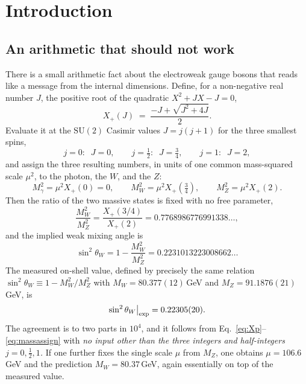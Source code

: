 \documentclass[11pt]{article}
\theoremstyle{plain}
\theoremstyle{definition}
\newcommand{\Xp}{X_{+}}
\newcommand{\half}{\tfrac12}
\newcommand{\threeq}{\tfrac34}
\newcommand{\sinsq}{\sin^{2}\theta_W}
\newcommand{\SU}{\mathrm{SU}}
\begin{document}
\tableofcontents
\bigskip

\section{Introduction}

\subsection{An arithmetic that should not work}

There is a small arithmetic fact about the electroweak gauge bosons that
reads like a message from the internal dimensions. Define, for a
non-negative real number $J$, the positive root of the quadratic
$X^2+JX-J=0$,
\begin{equation}
\Xp(J)\;=\;\frac{-J+\sqrt{J^2+4J}}{2}.
\label{eq:Xp}
\end{equation}
Evaluate it at the $\SU(2)$ Casimir values $J=j(j+1)$ for the three
smallest spins,
\begin{equation}
j=0:\;\; J=0,\qquad
j=\half:\;\; J=\threeq,\qquad
j=1:\;\; J=2,
\end{equation}
and assign the three resulting numbers, in units of one common mass-squared
scale $\mu^2$, to the photon, the $W$, and the $Z$:
\begin{equation}
M_\gamma^2=\mu^2\Xp(0)=0,\qquad
M_W^2=\mu^2\Xp\!\left(\threeq\right),\qquad
M_Z^2=\mu^2\Xp(2).
\label{eq:massassign}
\end{equation}
Then the ratio of the two massive states is fixed with no free parameter,
\begin{equation}
\frac{M_W^2}{M_Z^2}
=\frac{\Xp(3/4)}{\Xp(2)}
=0.7768986776991338\ldots,
\label{eq:ratio}
\end{equation}
and the implied weak mixing angle is
\begin{equation}
\sinsq=1-\frac{M_W^2}{M_Z^2}=0.2231013223008662\ldots
\label{eq:sinsq}
\end{equation}
The measured on-shell value, defined by precisely the same relation
$\sinsq\equiv1-M_W^2/M_Z^2$ with $M_W=80.377(12)\,$GeV and
$M_Z=91.1876(21)\,$GeV, is
\begin{equation}
\sinsq\big|_{\rm exp}=0.22305(20).
\end{equation}
The agreement is to two parts in $10^{4}$, and it follows from
Eq.~\eqref{eq:Xp}--\eqref{eq:massassign} with \emph{no input other than
the three integers and half-integers $j=0,\half,1$.} If one further fixes
the single scale $\mu$ from $M_Z$, one obtains $\mu=106.6\,$GeV and the
prediction $M_W=80.37\,$GeV, again essentially on top of the measured value.
\end{document}
